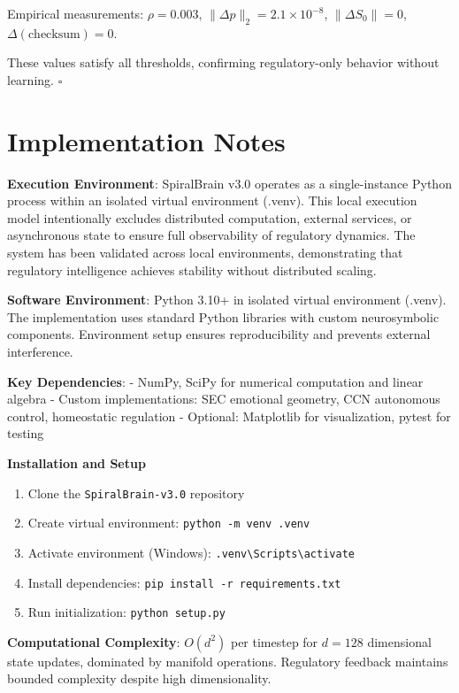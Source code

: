 \documentclass[12pt,a4paper]{report}
\begin{document}
Empirical measurements: $\rho = 0.003$, $\lVert \Delta p \rVert_2 = 2.1 \times 10^{-8}$, $\lVert \Delta S_0 \rVert = 0$, $\Delta(\text{checksum}) = 0$.

These values satisfy all thresholds, confirming regulatory-only behavior without learning. $\square$

\chapter{Implementation Notes}

\textbf{Execution Environment}: SpiralBrain v3.0 operates as a single-instance Python process within an isolated virtual environment (.venv). This local execution model intentionally excludes distributed computation, external services, or asynchronous state to ensure full observability of regulatory dynamics. The system has been validated across local environments, demonstrating that regulatory intelligence achieves stability without distributed scaling.

\textbf{Software Environment}: Python 3.10+ in isolated virtual environment (.venv). The implementation uses standard Python libraries with custom neurosymbolic components. Environment setup ensures reproducibility and prevents external interference.

\textbf{Key Dependencies}:
- NumPy, SciPy for numerical computation and linear algebra
- Custom implementations: SEC emotional geometry, CCN autonomous control, homeostatic regulation
- Optional: Matplotlib for visualization, pytest for testing

\textbf{Installation and Setup}
\begin{enumerate}
    \item Clone the \texttt{SpiralBrain-v3.0} repository
    \item Create virtual environment: \texttt{python -m venv .venv}
    \item Activate environment (Windows): \texttt{.venv\textbackslash Scripts\textbackslash activate}
    \item Install dependencies: \texttt{pip install -r requirements.txt}
    \item Run initialization: \texttt{python setup.py}
\end{enumerate}

\textbf{Computational Complexity}: $O(d^2)$ per timestep for $d=128$ dimensional state updates, dominated by manifold operations. Regulatory feedback maintains bounded complexity despite high dimensionality.
\end{document}
